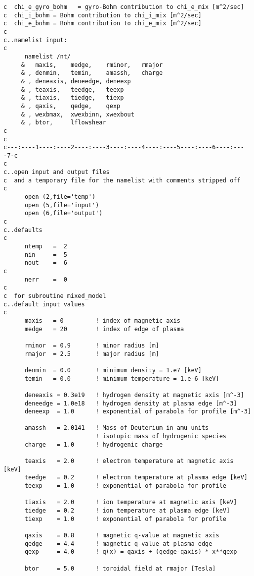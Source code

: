 \begin{verbatim}
c  chi_e_gyro_bohm   = gyro-Bohm contribution to chi_e_mix [m^2/sec]
c  chi_i_bohm = Bohm contribution to chi_i_mix [m^2/sec]
c  chi_e_bohm = Bohm contribution to chi_e_mix [m^2/sec]
c
c..namelist input:
c
      namelist /nt/
     &   maxis,    medge,    rminor,   rmajor
     & , denmin,   temin,    amassh,   charge
     & , deneaxis, deneedge, deneexp
     & , teaxis,   teedge,   teexp
     & , tiaxis,   tiedge,   tiexp
     & , qaxis,    qedge,    qexp
     & , wexbmax,  xwexbinn, xwexbout
     & , btor,     lflowshear
c
c
c---:----1----:----2----:----3----:----4----:----5----:----6----:----7-c
c
c..open input and output files
c  and a temporary file for the namelist with comments stripped off
c
      open (2,file='temp')
      open (5,file='input')
      open (6,file='output')
c
c..defaults
c
      ntemp   =  2
      nin     =  5
      nout    =  6
c
      nerr    =  0
c
c  for subroutine mixed_model
c..default input values
c
      maxis   = 0         ! index of magnetic axis
      medge   = 20        ! index of edge of plasma

      rminor  = 0.9       ! minor radius [m]
      rmajor  = 2.5       ! major radius [m]

      denmin  = 0.0       ! minimum density = 1.e7 [keV]
      temin   = 0.0       ! minimum temperature = 1.e-6 [keV]

      deneaxis = 0.3e19   ! hydrogen density at magnetic axis [m^-3]
      deneedge = 1.0e18   ! hydrogen density at plasma edge [m^-3]
      deneexp  = 1.0      ! exponential of parabola for profile [m^-3]

      amassh   = 2.0141   ! Mass of Deuterium in amu units
                          ! isotopic mass of hydrogenic species
      charge   = 1.0      ! hydrogenic charge

      teaxis   = 2.0      ! electron temperature at magnetic axis [keV]
      teedge   = 0.2      ! electron temperature at plasma edge [keV]
      teexp    = 1.0      ! exponential of parabola for profile

      tiaxis   = 2.0      ! ion temperature at magnetic axis [keV]
      tiedge   = 0.2      ! ion temperature at plasma edge [keV]
      tiexp    = 1.0      ! exponential of parabola for profile

      qaxis    = 0.8      ! magnetic q-value at magnetic axis
      qedge    = 4.4      ! magnetic q-value at plasma edge
      qexp     = 4.0      ! q(x) = qaxis + (qedge-qaxis) * x**qexp

      btor     = 5.0      ! toroidal field at rmajor [Tesla]


\end{verbatim}
